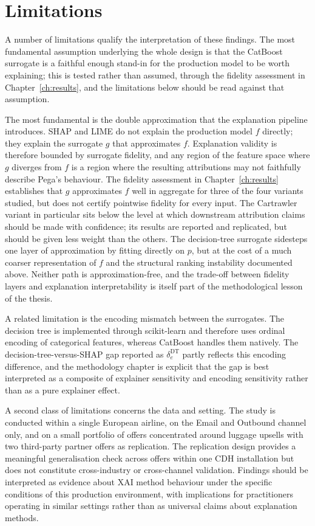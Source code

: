 \documentclass[oneside]{memoir} %
\begin{document}
\section{Limitations} \label{sec:limitations}

A number of limitations qualify the interpretation of these findings. The most fundamental assumption underlying the whole design is that the CatBoost surrogate is a faithful enough stand-in for the production model to be worth explaining; this is tested rather than assumed, through the fidelity assessment in Chapter~\ref{ch:results}, and the limitations below should be read against that assumption.

The most fundamental is the double approximation that the explanation pipeline introduces. SHAP and LIME do not explain the production model $f$ directly; they explain the surrogate $g$ that approximates $f$. Explanation validity is therefore bounded by surrogate fidelity, and any region of the feature space where $g$ diverges from $f$ is a region where the resulting attributions may not faithfully describe Pega's behaviour. The fidelity assessment in Chapter~\ref{ch:results} establishes that $g$ approximates $f$ well in aggregate for three of the four variants studied, but does not certify pointwise fidelity for every input. The Cartrawler variant in particular sits below the level at which downstream attribution claims should be made with confidence; its results are reported and replicated, but should be given less weight than the others. The decision-tree surrogate sidesteps one layer of approximation by fitting directly on $p$, but at the cost of a much coarser representation of $f$ and the structural ranking instability documented above. Neither path is approximation-free, and the trade-off between fidelity layers and explanation interpretability is itself part of the methodological lesson of the thesis.

A related limitation is the encoding mismatch between the surrogates. The decision tree is implemented through scikit-learn and therefore uses ordinal encoding of categorical features, whereas CatBoost handles them natively. The decision-tree-versus-SHAP gap reported as $\delta_e^{\mathrm{DT}}$ partly reflects this encoding difference, and the methodology chapter is explicit that the gap is best interpreted as a composite of explainer sensitivity and encoding sensitivity rather than as a pure explainer effect.

A second class of limitations concerns the data and setting. The study is conducted within a single European airline, on the Email and Outbound channel only, and on a small portfolio of offers concentrated around luggage upsells with two third-party partner offers as replication. The replication design provides a meaningful generalisation check across offers within one CDH installation but does not constitute cross-industry or cross-channel validation. Findings should be interpreted as evidence about XAI method behaviour under the specific conditions of this production environment, with implications for practitioners operating in similar settings rather than as universal claims about explanation methods.
\end{document}
